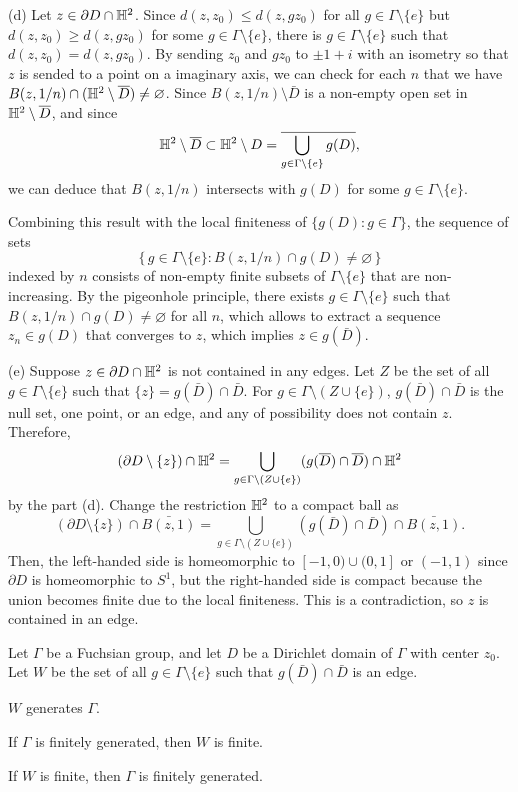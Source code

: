 \documentclass[12pt]{article}
\begin{document}
\begin{pf}
(d)
Let $z\in\partial D\cap\mathbb{H}^2$.
Since $d(z,z_0)\le d(z,gz_0)$ for all $g\in\Gamma\setminus\{e\}$ but $d(z,z_0)\ge d(z,gz_0)$ for some $g\in\Gamma\setminus\{e\}$, there is $g\in\Gamma\setminus\{e\}$ such that $d(z,z_0)=d(z,gz_0)$.
By sending $z_0$ and $gz_0$ to $\pm1+i$ with an isometry so that $z$ is sended to a point on a imaginary axis, we can check for each $n$ that we have $B(z,1/n)\cap(\mathbb{H}^2\setminus\overline D)\ne\varnothing$.
Since $B(z,1/n)\setminus\bar D$ is a non-empty open set in $\mathbb{H}^2\setminus\overline D$, and since
\[\mathbb{H}^2\setminus\overline D\subset\mathbb{H}^2\setminus D=\overline{\bigcup_{g\in\Gamma\setminus\{e\}}g(D)},\]
we can deduce that $B(z,1/n)$ intersects with $g(D)$ for some $g\in\Gamma\setminus\{e\}$.

Combining this result with the local finiteness of $\{g(D):g\in\Gamma\}$, the sequence of sets
\[\{\,g\in\Gamma\setminus\{e\}:B(z,1/n)\cap g(D)\ne\varnothing\,\}\]
indexed by $n$ consists of non-empty finite subsets of $\Gamma\setminus\{e\}$ that are non-increasing.
By the pigeonhole principle, there exists $g\in\Gamma\setminus\{e\}$ such that $B(z,1/n)\cap g(D)\ne\varnothing$ for all $n$, which allows to extract a sequence $z_n\in g(D)$ that converges to $z$, which implies $z\in g(\bar D)$.

(e)
Suppose $z\in\partial D\cap\mathbb{H}^2$ is not contained in any edges.
Let $Z$ be the set of all $g\in\Gamma\setminus\{e\}$ such that $\{z\}=g(\bar D)\cap\bar D$.
For $g\in\Gamma\setminus(Z\cup\{e\})$, $g(\bar D)\cap\bar D$ is the null set, one point, or an edge, and any of possibility does not contain $z$.
Therefore,
\[(\partial D\setminus\{z\})\cap\mathbb{H}^2=\bigcup_{g\in\Gamma\setminus(Z\cup\{e\})}(g(\overline D)\cap\overline D)\cap\mathbb{H}^2\]
by the part (d).
Change the restriction $\mathbb{H}^2$ to a compact ball as
\[(\partial D\setminus\{z\})\cap\bar{B(z,1)}=\bigcup_{g\in\Gamma\setminus(Z\cup\{e\})}(g(\bar D)\cap\bar D)\cap\bar{B(z,1)}.\]
Then, the left-handed side is homeomorphic to $[-1,0)\cup(0,1]$ or $(-1,1)$ since $\partial D$ is homeomorphic to $S^1$, but the right-handed side is compact because the union becomes finite due to the local finiteness.
This is a contradiction, so $z$ is contained in an edge.
\end{pf}

\begin{prb}
Let $\Gamma$ be a Fuchsian group, and let $D$ be a Dirichlet domain of $\Gamma$ with center $z_0$.
Let $W$ be the set of all $g\in\Gamma\setminus\{e\}$ such that $g(\bar D)\cap\bar D$ is an edge.
\begin{parts}
\item $W$ generates $\Gamma$.
\item If $\Gamma$ is finitely generated, then $W$ is finite.
\item If $W$ is finite, then $\Gamma$ is finitely generated.
\end{parts}
\end{prb}
\end{document}
